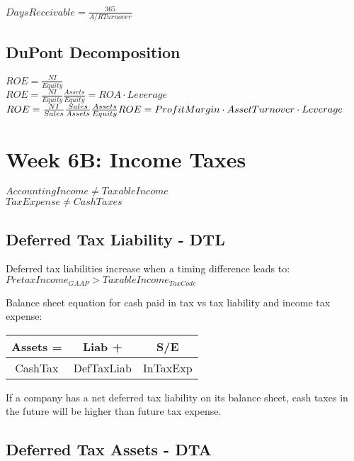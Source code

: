 $Days Receivable = \frac{365}{A/R Turnover}$  

\subsection*{DuPont Decomposition}

$ROE = \frac{NI}{Equity}$ \\

$ROE = \frac{NI}{Equity} \frac{Assets}{Equity} = ROA \cdot Leverage$  \\

$ROE = \frac{NI}{Sales} \frac{Sales}{Assets}\frac{Assets}{Equity} \\
 ROE = ProfitMargin \cdot AssetTurnover \cdot Leverage $  \\
 

\section*{Week 6B: Income Taxes}

$AccountingIncome \neq Taxable Income$ \\
$Tax Expense \neq Cash Taxes $ \\


\subsection*{Deferred Tax Liability - DTL}

Deferred tax liabilities increase when a timing difference leads to: \\
 $PretaxIncome_{GAAP}>Taxable Income_{TaxCode}	$

Balance sheet equation for cash paid in tax vs tax liability and income tax expense:
\begin{tabular}{ |c||c|c| } 
	\hline
	  Assets = & Liab +  & S/E	 \\ 
	\hline
	  CashTax & DefTaxLiab  & InTaxExp	 \\ 
   	
	\hline
\end{tabular}

If a company has a net deferred tax liability on its balance sheet, cash taxes in the future will be higher than future tax expense.
 
\subsection*{ Deferred Tax Assets - DTA}
 
